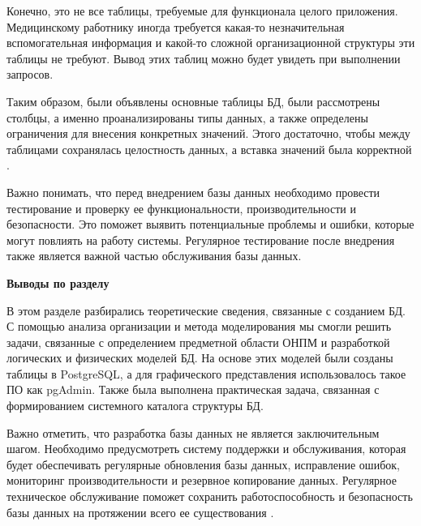 Конечно, это не все таблицы, требуемые для функционала целого приложения. Медицинскому работнику иногда требуется какая-то незначительная вспомогательная информация и какой-то сложной организационной структуры эти таблицы не требуют. Вывод этих таблиц можно будет увидеть при выполнении запросов.

Таким образом, были объявлены основные таблицы БД, были рассмотрены столбцы, а именно проанализированы типы данных, а также определены ограничения для внесения конкретных значений. Этого достаточно, чтобы между таблицами сохранялась целостность данных, а вставка значений была корректной \cite{online1, online2, online3}.

Важно понимать, что перед внедрением базы данных необходимо провести тестирование и проверку ее функциональности, производительности и безопасности. Это поможет выявить потенциальные проблемы и ошибки, которые могут повлиять на работу системы. Регулярное тестирование после внедрения также является важной частью обслуживания базы данных.



\bigbreak
\textbf{Выводы по разделу}
\bigbreak

В этом разделе разбирались теоретические сведения, связанные с созданием БД. С помощью анализа организации и метода моделирования мы смогли решить задачи, связанные с определением предметной области ОНПМ и разработкой логических и физических моделей БД. На основе этих моделей были созданы таблицы в PostgreSQL, а для графического представления использовалось такое ПО как pgAdmin. Также была выполнена практическая задача, связанная с формированием системного каталога структуры БД.

Важно отметить, что разработка базы данных не является заключительным шагом. Необходимо предусмотреть систему поддержки и обслуживания, которая будет обеспечивать регулярные обновления базы данных, исправление ошибок, мониторинг производительности и резервное копирование данных. Регулярное техническое обслуживание поможет сохранить работоспособность и безопасность базы данных на протяжении всего ее существования \cite{online13}.